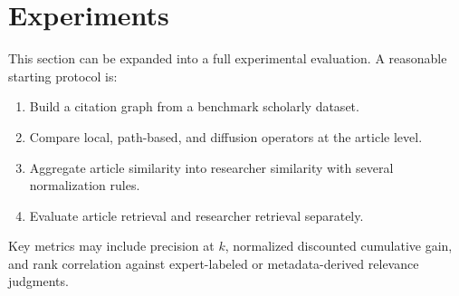 \section{Experiments}
\label{sec:experiments}

This section can be expanded into a full experimental evaluation. A reasonable starting
protocol is:
\begin{enumerate}
    \item Build a citation graph from a benchmark scholarly dataset.
    \item Compare local, path-based, and diffusion operators at the article level.
    \item Aggregate article similarity into researcher similarity with several
    normalization rules.
    \item Evaluate article retrieval and researcher retrieval separately.
\end{enumerate}

Key metrics may include precision at $k$, normalized discounted cumulative gain, and rank
correlation against expert-labeled or metadata-derived relevance judgments.
